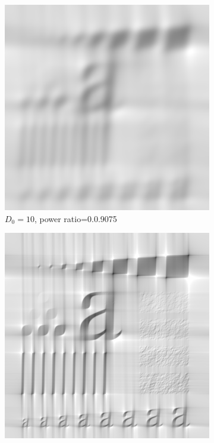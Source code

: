 \begin{figure}[h!]
	\centering
	\begin{subfigure}[b]{0.45\linewidth}
		\includegraphics[width=\linewidth]{myfigure/p3/GLPF_10.png}
		\caption{$D_0=10$, power ratio=0.0.9075}
		\label{fig:GLPF_10}
	\end{subfigure}
  	\begin{subfigure}[b]{0.45\linewidth}
		\includegraphics[width=\linewidth]{myfigure/p3/GLPF_100.png}

\end{subfigure}
\end{figure}
